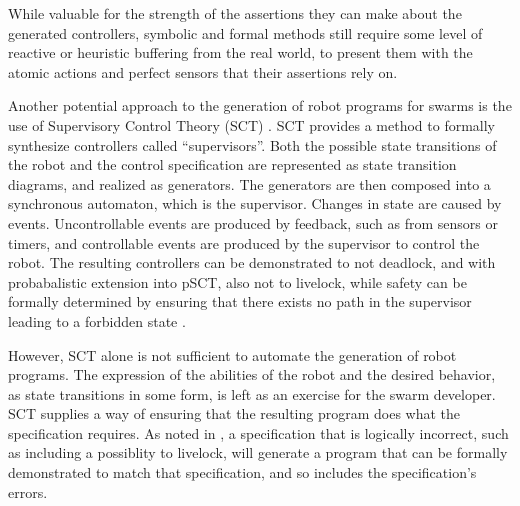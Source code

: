 While valuable for the strength of the assertions they can make about the generated controllers, symbolic and formal methods still require some level of reactive or heuristic buffering from the real world, to present them with the atomic actions and perfect sensors that their assertions rely on. 

Another potential approach to the generation of robot programs for swarms is the use of Supervisory Control Theory (SCT) \citep{lopes2016supervisory}.
SCT provides a method to formally synthesize controllers called ``supervisors''. 
Both the possible state transitions of the robot and the control specification are represented as state transition diagrams, and realized as generators. 
The generators are then composed into a synchronous automaton, which is the supervisor. 
Changes in state are caused by events.
Uncontrollable events are produced by feedback, such as from sensors or timers, and controllable events are produced by the supervisor to control the robot. 
The resulting controllers can be demonstrated to not deadlock, and with probabalistic extension into pSCT, also not to livelock, while safety can be formally determined by ensuring that there exists no path in the supervisor leading to a forbidden state \citep{lopes2017probabilistic}. 

However, SCT alone is not sufficient to automate the generation of robot programs.
The expression of the abilities of the robot and the desired behavior, as state transitions in some form, is left as an exercise for the swarm developer. 
SCT supplies a way of ensuring that the resulting program does what the specification requires. 
As noted in \citep{lopes2017probabilistic}, a specification that is logically incorrect, such as including a possiblity to livelock, will generate a program that can be formally demonstrated to match that specification, and so includes the specification's errors. 

